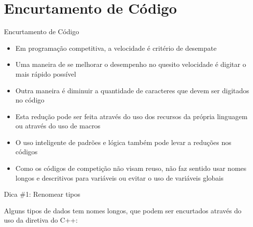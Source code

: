 \section{Encurtamento de Código}

\begin{frame}[fragile]{Encurtamento de Código}

    \begin{itemize}
        \item Em programação competitiva, a velocidade é critério de desempate

        \item Uma maneira de se melhorar o desempenho no quesito velocidade é digitar o mais
            rápido possível

        \item Outra maneira é diminuir a quantidade de caracteres que devem ser digitados no
            código

        \item Esta redução pode ser feita através do uso dos recursos da própria linguagem ou
            através do uso de macros

        \item O uso inteligente de padrões e lógica também pode levar a reduções nos códigos

        \item Como os códigos de competição não visam reuso, não faz sentido usar nomes longos
            e descritivos para variáveis ou evitar o uso de variáveis globais
    \end{itemize}

\end{frame}

\begin{frame}[fragile]{Dica \#1: Renomear tipos}

    Alguns tipos de dados tem nomes longos, que podem ser encurtados através do uso
    da diretiva  do C++:

\end{frame}

